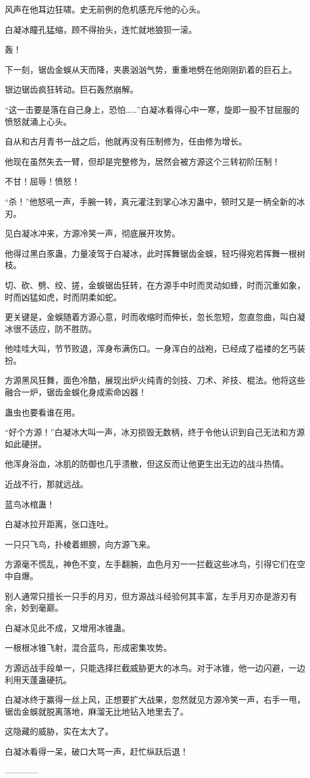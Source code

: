 \begin{this_body}
风声在他耳边狂啸。史无前例的危机感充斥他的心头。

白凝冰瞳孔猛缩，顾不得抬头，连忙就地狼狈一滚。

轰！

下一刻，锯齿金蜈从天而降，夹裹汹汹气势，重重地劈在他刚刚趴着的巨石上。

银边锯齿疯狂转动。巨石轰然崩解。

“这一击要是落在自己身上，恐怕……”白凝冰看得心中一寒，旋即一股不甘屈服的愤怒就涌上心头。

自从和古月青书一战之后，他就再没有压制修为，任由修为增长。

他现在虽然失去一臂，但却是完整修为，居然会被方源这个三转初阶压制！

不甘！屈辱！愤怒！

“杀！”他怒吼一声，手腕一转，真元灌注到掌心冰刃蛊中，顿时又是一柄全新的冰刃。

见白凝冰冲来，方源冷笑一声，彻底展开攻势。

他得过黑白豕蛊，力量凌驾于白凝冰，此时挥舞锯齿金蜈，轻巧得宛若挥舞一根树枝。

切、砍、劈、绞、搓，金蜈锯齿狂转，在方源手中时而灵动如蜂，时而沉重如象，时而凶猛如虎，时而阴柔如蛇。

更关键是，金蜈随着方源心意，时而收缩时而伸长，忽长忽短，忽直忽曲，叫白凝冰很不适应，防不胜防。

他哇哇大叫，节节败退，浑身布满伤口。一身浑白的战袍，已经成了褴褛的乞丐装扮。

方源黑风狂舞，面色冷酷，展现出炉火纯青的剑技、刀术、斧技、棍法。他将这些融合一炉，锯齿金蜈化身成索命凶器！

蛊虫也要看谁在用。

“好个方源！”白凝冰大叫一声，冰刃损毁无数柄，终于令他认识到自己无法和方源如此硬拼。

他浑身浴血，冰肌的防御也几乎溃散，但这反而让他更生出无边的战斗热情。

近战不行，那就远战。

蓝鸟冰棺蛊！

白凝冰拉开距离，张口连吐。

一只只飞鸟，扑棱着翅膀，向方源飞来。

方源毫不慌乱，神色不变，左手翻腕，血色月刃一一拦截这些冰鸟，引得它们在空中自爆。

别人通常只擅长一只手的月刃，但方源战斗经验何其丰富，左手月刃亦是游刃有余，妙到毫巅。

白凝冰见此不成，又增用冰锥蛊。

一根根冰锥飞射，混合蓝鸟，形成密集攻势。

方源远战手段单一，只能选择拦截威胁更大的冰鸟。对于冰锥，他一边闪避，一边利用天蓬蛊硬抗。

白凝冰终于赢得一丝上风，正想要扩大战果，忽然就见方源冷笑一声，右手一甩，锯齿金蜈就脱离落地，麻溜无比地钻入地里去了。

这隐藏的威胁，实在太大了。

白凝冰看得一呆，破口大骂一声，赶忙纵跃后退！

------------

\end{this_body}


